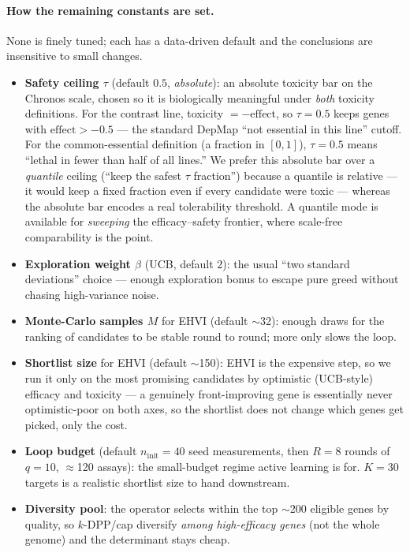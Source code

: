 \documentclass[11pt]{article}
\begin{document}
\paragraph{How the remaining constants are set.} None is finely tuned; each has a
data-driven default and the conclusions are insensitive to small changes.
\begin{itemize}[leftmargin=2em,itemsep=1pt]
\item \textbf{Safety ceiling $\tau$} (default $0.5$, \emph{absolute}): an absolute toxicity
bar on the Chronos scale, chosen so it is biologically meaningful under \emph{both} toxicity
definitions. For the contrast line, toxicity $=-\mathrm{effect}$, so $\tau{=}0.5$ keeps genes
with $\mathrm{effect}>-0.5$ --- the standard DepMap ``not essential in this line'' cutoff.
For the common-essential definition (a fraction in $[0,1]$), $\tau{=}0.5$ means ``lethal in
fewer than half of all lines.'' We prefer this absolute bar over a \emph{quantile} ceiling
(``keep the safest $\tau$ fraction'') because a quantile is relative --- it would keep a
fixed fraction even if every candidate were toxic --- whereas the absolute bar encodes a
real tolerability threshold. A quantile mode is available for \emph{sweeping} the
efficacy--safety frontier, where scale-free comparability is the point.
\item \textbf{Exploration weight $\beta$} (UCB, default $2$): the usual ``two standard
deviations'' choice --- enough exploration bonus to escape pure greed without chasing
high-variance noise.
\item \textbf{Monte-Carlo samples $M$} for EHVI (default $\sim$32): enough draws for the
ranking of candidates to be stable round to round; more only slows the loop.
\item \textbf{Shortlist size} for EHVI (default $\sim$150): EHVI is the expensive step, so we
run it only on the most promising candidates by optimistic (UCB-style) efficacy and
toxicity --- a genuinely front-improving gene is essentially never optimistic-poor on both
axes, so the shortlist does not change which genes get picked, only the cost.
\item \textbf{Loop budget} (default $n_{\text{init}}{=}40$ seed measurements, then $R{=}8$
rounds of $q{=}10$, $\approx$120 assays): the small-budget regime active learning is for.
$K{=}30$ targets is a realistic shortlist size to hand downstream.
\item \textbf{Diversity pool}: the operator selects within the top $\sim$200 eligible genes
by quality, so $k$-DPP/cap diversify \emph{among high-efficacy genes} (not the whole genome)
and the determinant stays cheap.
\end{itemize}
\end{document}
